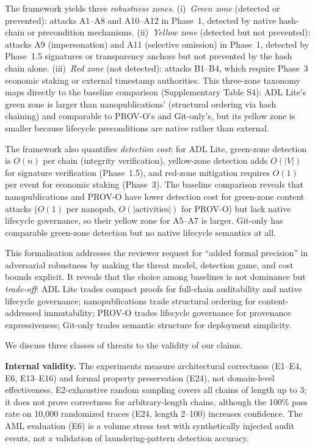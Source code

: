 The framework yields three \emph{robustness zones}. (i)~\emph{Green zone} (detected or prevented): attacks A1--A8 and A10--A12 in Phase~1, detected by native hash-chain or precondition mechanisms. (ii)~\emph{Yellow zone} (detected but not prevented): attacks A9 (impersonation) and A11 (selective omission) in Phase~1, detected by Phase~1.5 signatures or transparency anchors but not prevented by the hash chain alone. (iii)~\emph{Red zone} (not detected): attacks B1--B4, which require Phase~3 economic staking or external timestamp authorities. This three-zone taxonomy maps directly to the baseline comparison (Supplementary Table S4): ADL Lite's green zone is larger than nanopublications' (structural ordering via hash chaining) and comparable to PROV-O's and Git-only's, but its yellow zone is smaller because lifecycle preconditions are native rather than external.

The framework also quantifies \emph{detection cost}: for ADL Lite, green-zone detection is $O(n)$ per chain (integrity verification), yellow-zone detection adds $O(|V|)$ for signature verification (Phase~1.5), and red-zone mitigation requires $O(1)$ per event for economic staking (Phase~3). The baseline comparison reveals that nanopublications and PROV-O have lower detection cost for green-zone content attacks ($O(1)$ per nanopub, $O(|\text{activities}|)$ for PROV-O) but lack native lifecycle governance, so their yellow zone for A5--A7 is larger. Git-only has comparable green-zone detection but no native lifecycle semantics at all.

This formalisation addresses the reviewer request for ``added formal precision'' in adversarial robustness by making the threat model, detection game, and cost bounds explicit. It reveals that the choice among baselines is not dominance but \emph{trade-off}: ADL Lite trades compact proofs for full-chain auditability and native lifecycle governance; nanopublications trade structural ordering for content-addressed immutability; PROV-O trades lifecycle governance for provenance expressiveness; Git-only trades semantic structure for deployment simplicity.

We discuss three classes of threats to the validity of our claims.

\textbf{Internal validity.} The experiments measure architectural correctness (E1--E4, E6, E13--E16) and formal property preservation (E24), not domain-level effectiveness. E2-exhaustive random sampling covers all chains of length up to 3; it does not prove correctness for arbitrary-length chains, although the 100\% pass rate on 10,000 randomized traces (E24, length 2--100) increases confidence. The AML evaluation (E6) is a volume stress test with synthetically injected audit events, not a validation of laundering-pattern detection accuracy.

